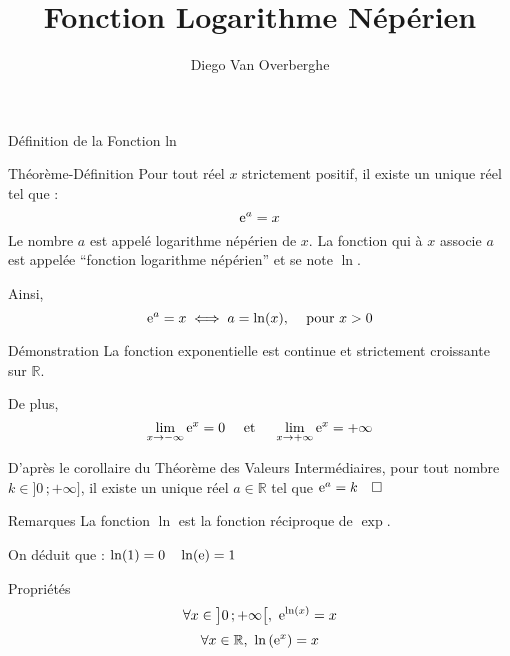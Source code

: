 \documentclass{cours}
\title{Fonction Logarithme Népérien}
\author{Diego Van Overberghe}
\begin{document}

    \begin{Gpartie}{Définition de la Fonction ln}
        \begin{Spartie}{Théorème-Définition}
            Pour tout réel $x$ strictement positif, il existe un unique réel tel que :
            \[\mathrm{e}^a=x\]
            Le nombre $a$ est appelé logarithme népérien de $x$. La fonction qui à $x$ associe $a$ est appelée ``fonction logarithme népérien'' et se note $\ln$.

            Ainsi,
            \[\mathrm{e}^a=x\iff a=\ln(x)\text{, \quad pour $x>0$}\]
        \end{Spartie}
        \begin{Spartie}{Démonstration}
            La fonction exponentielle est continue et strictement croissante sur $\mathbb{R}$.

            De plus, 
            \[\lim_{x\to -\infty} \mathrm{e}^x=0\quad\text{ et }\quad\lim_{x\to +\infty} \mathrm{e}^x=+\infty\]

            D'après le corollaire du Théorème des Valeurs Intermédiaires, pour tout nombre $k\in\big]0\,;+\infty\big]$, il existe un unique réel $a\in\mathbb{R}$ tel que $\mathrm{e}^a=k\quad\square$
        \end{Spartie}
        \begin{Spartie}{Remarques}
            La fonction $\ln$ est la fonction réciproque de $\exp$.

            On déduit que : $\ln(1)=0\quad\ln(\mathrm{e})=1$
        \end{Spartie}
        \begin{Spartie}{Propriétés}
            \[\forall x\in\big]0\,;+\infty\big[,\ \mathrm{e}^{\ln(x)}=x\]
            \[\forall x\in\mathbb{R},\ \ln\left(\me^x\right)=x\]
        \end{Spartie}
    \end{Gpartie}
    \pagebreak
\end{document}
